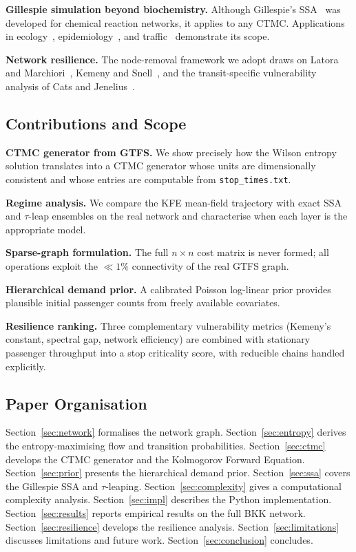 \documentclass[12pt,a4paper]{article}
\theoremstyle{plain}
\theoremstyle{definition}
\theoremstyle{remark}
\begin{document}
\textbf{Gillespie simulation beyond biochemistry.}
Although Gillespie's SSA~\citep{gillespie1977} was developed for chemical
reaction networks, it applies to any CTMC.  Applications in
ecology~\citep{wilkinson2018}, epidemiology~\citep{allen2008}, and
traffic~\citep{maerivoet2005} demonstrate its scope.

\textbf{Network resilience.}
The node-removal framework we adopt draws on Latora and
Marchiori~\citep{latora2001}, Kemeny and Snell~\citep{kemeny1976}, and the
transit-specific vulnerability analysis of Cats and
Jenelius~\citep{cats2014}.

\subsection{Contributions and Scope}

\begin{description}[leftmargin=2em]
  \item[C1.] \textbf{CTMC generator from GTFS.}  We show precisely how the
    Wilson entropy solution translates into a CTMC generator whose units are
    dimensionally consistent and whose entries are computable from
    \texttt{stop\_times.txt}.
  \item[C2.] \textbf{Regime analysis.}  We compare the KFE mean-field
    trajectory with exact SSA and $\tau$-leap ensembles on the real network and
    characterise when each layer is the appropriate model.
  \item[C3.] \textbf{Sparse-graph formulation.}  The full $n\times n$ cost
    matrix is never formed; all operations exploit the $\ll1\%$ connectivity
    of the real GTFS graph.
  \item[C4.] \textbf{Hierarchical demand prior.}  A calibrated Poisson
    log-linear prior provides plausible initial passenger counts from freely
    available covariates.
  \item[C5.] \textbf{Resilience ranking.}  Three complementary vulnerability
    metrics (Kemeny's constant, spectral gap, network efficiency) are combined
    with stationary passenger throughput into a stop criticality score, with
    reducible chains handled explicitly.
\end{description}

\subsection{Paper Organisation}

Section~\ref{sec:network} formalises the network graph.
Section~\ref{sec:entropy} derives the entropy-maximising flow and transition
probabilities.
Section~\ref{sec:ctmc} develops the CTMC generator and the Kolmogorov Forward
Equation.
Section~\ref{sec:prior} presents the hierarchical demand prior.
Section~\ref{sec:ssa} covers the Gillespie SSA and $\tau$-leaping.
Section~\ref{sec:complexity} gives a computational complexity analysis.
Section~\ref{sec:impl} describes the Python implementation.
Section~\ref{sec:results} reports empirical results on the full BKK network.
Section~\ref{sec:resilience} develops the resilience analysis.
Section~\ref{sec:limitations} discusses limitations and future work.
Section~\ref{sec:conclusion} concludes.
\end{document}
